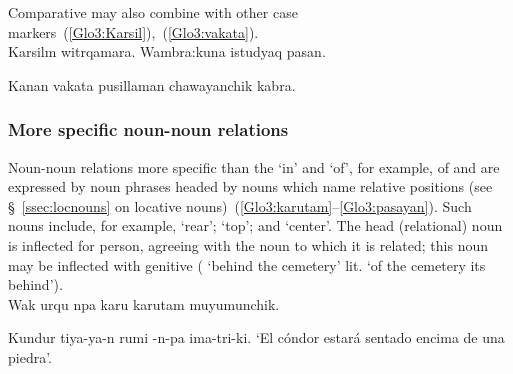\noindent
Comparative  may also combine with other case markers~(\ref{Glo3:Karsil}),~(\ref{Glo3:vakata}).\\

%
{Karsilm witrqamara. Wambra:kuna istudyaq pasan.}%
{}%
{}{}%

%
{Kanan vakata pusillaman chawayanchik kabra.}%
{}%
{}{}%

\subsubsection{More specific noun-noun relations}\label{sssec:msnnr}
Noun-noun relations more specific than the ‘in’ and ‘of’, for example, of  and  are expressed by noun phrases headed by nouns which name relative positions (see §~\ref{ssec:locnouns} on locative nouns)~(\ref{Glo3:karutam}--\ref{Glo3:pasayan}). Such nouns include, for example,  ‘rear’;  ‘top’; and  ‘center’. The head (relational) noun is inflected for person, agreeing with the noun to which it is related; this noun may be inflected with genitive  ( ‘behind the cemetery’ lit. ‘of the cemetery its behind’).\\

%
{Wak urqu npa karu karutam muyumunchik.}%
{}%
{}{}%

%
{Kundur tiya-ya-n rumi -n-pa ima-tri-ki.}%
{}%
{‘El cóndor estará sentado encima de una piedra’.}%
{}{}%

